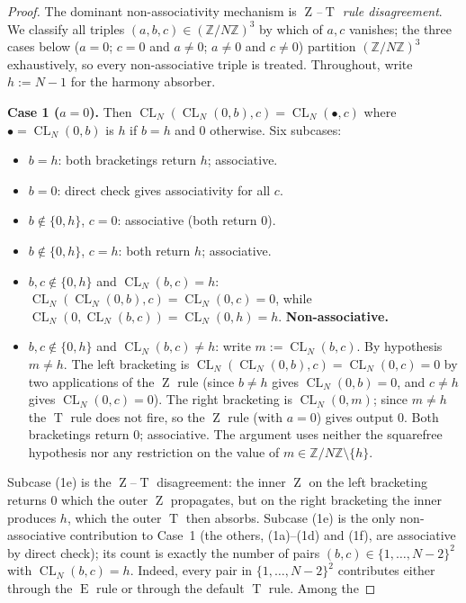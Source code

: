 \documentclass[11pt,reqno]{amsart}
\theoremstyle{plain}
\theoremstyle{definition}
\theoremstyle{remark}
\DeclareMathOperator{\CL}{CL}
\DeclareMathOperator{\ECHO}{E}
\DeclareMathOperator{\HARM}{T}
\DeclareMathOperator{\VOID}{Z}
\newcommand{\ZN}{\mathbb{Z}/N\mathbb{Z}}
\begin{document}
\begin{proof}
The dominant non-associativity mechanism is \emph{$\VOID$--$\HARM$ rule
disagreement}. We classify all triples
$(a,b,c)\in(\ZN)^{3}$ by which of $a,c$ vanishes; the three cases
below ($a=0$; $c=0$ and $a\neq 0$; $a\neq 0$ and $c\neq 0$) partition
$(\ZN)^{3}$ exhaustively, so every non-associative triple is treated.
Throughout, write $h:=N-1$ for the harmony absorber.

\medskip
\noindent\textbf{Case 1 ($a=0$).} Then
$\CL_N(\CL_N(0,b),c)=\CL_N(\bullet,c)$ where
$\bullet=\CL_N(0,b)$ is $h$ if $b=h$ and $0$ otherwise. Six subcases:
\begin{itemize}\setlength\itemsep{0pt}
\item[(1a)] $b=h$: both bracketings return $h$; associative.
\item[(1b)] $b=0$: direct check gives associativity for all $c$.
\item[(1c)] $b\notin\{0,h\}$, $c=0$: associative (both return $0$).
\item[(1d)] $b\notin\{0,h\}$, $c=h$: both return $h$; associative.
\item[(1e)] $b,c\notin\{0,h\}$ and $\CL_N(b,c)=h$:
  $\CL_N(\CL_N(0,b),c)=\CL_N(0,c)=0$, while
  $\CL_N(0,\CL_N(b,c))=\CL_N(0,h)=h$. \textbf{Non-associative.}
\item[(1f)] $b,c\notin\{0,h\}$ and $\CL_N(b,c)\neq h$: write
  $m := \CL_N(b,c)$. By hypothesis $m \neq h$. The left bracketing
  is $\CL_N(\CL_N(0,b),c) = \CL_N(0,c) = 0$ by two applications
  of the $\VOID$ rule (since $b\neq h$ gives $\CL_N(0,b)=0$, and
  $c\neq h$ gives $\CL_N(0,c)=0$). The right bracketing is
  $\CL_N(0,m)$; since $m \neq h$ the $\HARM$ rule does not fire,
  so the $\VOID$ rule (with $a=0$) gives output $0$. Both
  bracketings return $0$; associative. The argument uses neither
  the squarefree hypothesis nor any restriction on the value of
  $m \in \ZN\setminus\{h\}$.
\end{itemize}
Subcase (1e) is the $\VOID$--$\HARM$ disagreement: the inner $\VOID$
on the left bracketing returns $0$ which the outer $\VOID$ propagates,
but on the right bracketing the inner produces $h$, which the outer
$\HARM$ then absorbs. Subcase (1e) is the only non-associative
contribution to Case~1 (the others, (1a)--(1d) and (1f), are
associative by direct check); its count is exactly the number of
pairs $(b,c)\in\{1,\dots,N-2\}^{2}$ with $\CL_N(b,c)=h$. Indeed,
every pair in $\{1,\dots,N-2\}^{2}$ contributes either through the
$\ECHO$ rule or through the default $\HARM$ rule. Among the

\end{proof}
\end{document}
